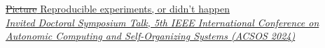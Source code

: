 \href{https://danysk.github.io/slides-2024-acsos-reproducibility/}{\sout{Picture} Reproducible experiments, or didn’t happen} \\
\href{https://2024.acsos.org/}{\textit{Invited Doctoral Symposium Talk, 5th IEEE International Conference on Autonomic Computing and Self-Organizing Systems (ACSOS 2024)}}
\\ \halfblankline \\
